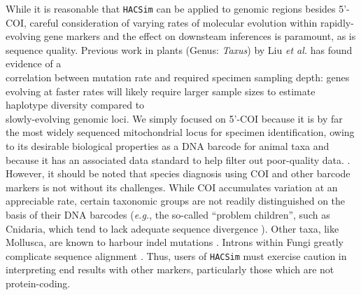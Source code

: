 While it is reasonable that {\tt HACSim} can be applied to genomic regions besides 5'-COI, careful consideration of varying rates of molecular evolution within rapidly-evolving gene markers and the effect on downsteam inferences is paramount, as is sequence quality. Previous work in plants (Genus: \textit{Taxus}) by Liu \textit{et al.} \cite{liu2012sampling} has found evidence of a \\ correlation between mutation rate and required specimen sampling depth: genes evolving at faster rates will likely require larger sample sizes to estimate haplotype diversity compared to \\ slowly-evolving genomic loci. We simply focused on 5'-COI because it is by far the most widely sequenced mitochondrial locus for specimen identification, owing to its desirable biological properties as a DNA barcode for animal taxa and because it has an associated data standard to help filter out poor-quality data. \cite{phillips2019incomplete}. However, it should be noted that species diagnosis using COI and other barcode markers is not without its challenges. While COI accumulates variation at an appreciable rate, certain taxonomic groups are not readily distinguished on the basis of their DNA barcodes (\textit{e.g.}, the so-called ``problem children'', such as Cnidaria, which tend to lack adequate sequence divergence \cite{bucklin2011dna}). Other taxa, like Mollusca, are known to harbour indel mutations \cite{layton2014patterns}. Introns within Fungi greatly complicate sequence alignment \cite{min2007assessing}. Thus, users of {\tt HACSim} must exercise caution in interpreting end results with other markers, particularly those which are not protein-coding.

